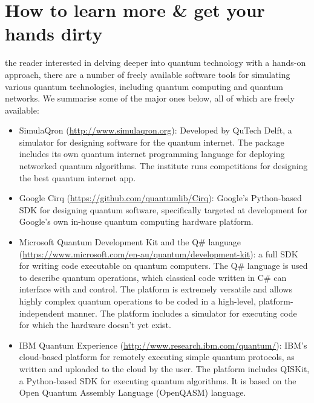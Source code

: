 %
%

\section{How to learn more \& get your hands dirty}

 the reader interested in delving deeper into quantum technology with a hands-on approach, there are a number of freely available software tools for simulating various quantum technologies, including quantum computing and quantum networks. We summarise some of the major ones below, all of which are freely available:

\begin{itemize}
	\item SimulaQron (\href{http://www.simulaqron.org}{http://www.simulaqron.org}): Developed by QuTech Delft, a simulator for designing software for the quantum internet. The package includes its own quantum internet programming language for deploying networked quantum algorithms. The institute runs competitions for designing the best quantum internet app.
	\item Google Cirq (\href{https://github.com/quantumlib/Cirq}{https://github.com/quantumlib/Cirq}): Google's Python-based SDK for designing quantum software, specifically targeted at development for Google's own in-house quantum computing hardware platform.
	\item Microsoft Quantum Development Kit and the Q\# language (\href{https://www.microsoft.com/en-au/quantum/development-kit}{https://www.microsoft.com/en-au/quantum/development-kit}): a full SDK for writing code executable on quantum computers. The Q\# language is used to describe quantum operations, which classical code written in C\# can interface with and control. The platform is extremely versatile and allows highly complex quantum operations to be coded in a high-level, platform-independent manner. The platform includes a simulator for executing code for which the hardware doesn't yet exist.
	\item IBM Quantum Experience (\href{http://www.research.ibm.com/quantum/}{http://www.research.ibm.com/quantum/}): IBM's cloud-based platform for remotely executing simple quantum protocols, as written and uploaded to the cloud by the user. The platform includes QISKit, a Python-based SDK for executing quantum algorithms. It is based on the Open Quantum Assembly Language (OpenQASM) language.
\end{itemize}

